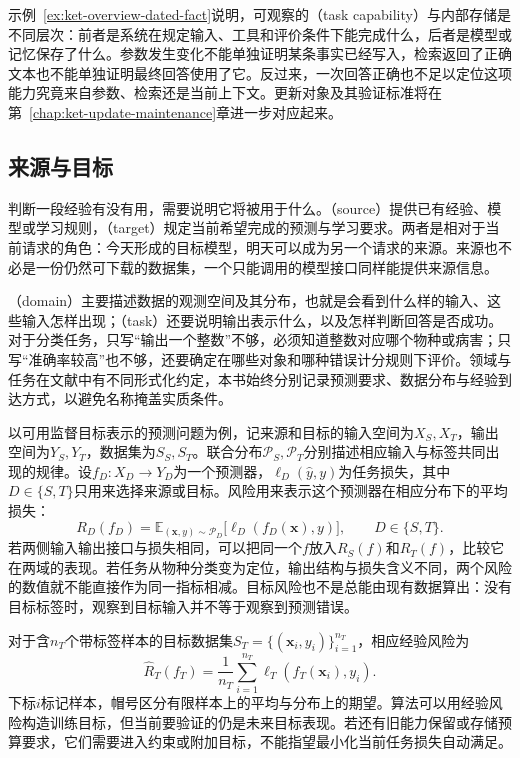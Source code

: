 示例~\ref{ex:ket-overview-dated-fact}说明，可观察的（task capability）与内部存储是不同层次：前者是系统在规定输入、工具和评价条件下能完成什么，后者是模型或记忆保存了什么。参数发生变化不能单独证明某条事实已经写入，检索返回了正确文本也不能单独证明最终回答使用了它。反过来，一次回答正确也不足以定位这项能力究竟来自参数、检索还是当前上下文。更新对象及其验证标准将在第~\ref{chap:ket-update-maintenance}章进一步对应起来。

\subsection{来源与目标}
\label{sec:ket-overview-source-target}

判断一段经验有没有用，需要说明它将被用于什么。（source）提供已有经验、模型或学习规则，（target）规定当前希望完成的预测与学习要求。两者是相对于当前请求的角色：今天形成的目标模型，明天可以成为另一个请求的来源。来源也不必是一份仍然可下载的数据集，一个只能调用的模型接口同样能提供来源信息。

（domain）主要描述数据的观测空间及其分布，也就是会看到什么样的输入、这些输入怎样出现；（task）还要说明输出表示什么，以及怎样判断回答是否成功。对于分类任务，只写“输出一个整数”不够，必须知道整数对应哪个物种或病害；只写“准确率较高”也不够，还要确定在哪些对象和哪种错误计分规则下评价。领域与任务在文献中有不同形式化约定，本书始终分别记录预测要求、数据分布与经验到达方式，以避免名称掩盖实质条件。

以可用监督目标表示的预测问题为例，记来源和目标的输入空间为$X_S,X_T$，输出空间为$Y_S,Y_T$，数据集为$S_S,S_T$。联合分布$\mathcal P_S,\mathcal P_T$分别描述相应输入与标签共同出现的规律。设$f_D:X_D\to Y_D$为一个预测器，$\ell_D(\hat y,y)$为任务损失，其中$D\in\{S,T\}$只用来选择来源或目标。风险用来表示这个预测器在相应分布下的平均损失：
\begin{equation}
  R_D(f_D)=
  \mathbb E_{(\bm{x},y)\sim\mathcal P_D}
  \bigl[\ell_D(f_D(\bm{x}),y)\bigr],
  \qquad D\in\{S,T\}.
  \label{eq:ket-overview-risk}
\end{equation}
若两侧输入输出接口与损失相同，可以把同一个$f$放入$R_S(f)$和$R_T(f)$，比较它在两域的表现。若任务从物种分类变为定位，输出结构与损失含义不同，两个风险的数值就不能直接作为同一指标相减。目标风险也不是总能由现有数据算出：没有目标标签时，观察到目标输入并不等于观察到预测错误。

对于含$n_T$个带标签样本的目标数据集$S_T=\{(\bm{x}_i,y_i)\}_{i=1}^{n_T}$，相应经验风险为
\begin{equation}
  \hat R_T(f_T)=\frac{1}{n_T}
  \sum_{i=1}^{n_T}\ell_T(f_T(\bm{x}_i),y_i).
  \label{eq:ket-overview-empirical-risk}
\end{equation}
下标$i$标记样本，帽号区分有限样本上的平均与分布上的期望。算法可以用经验风险构造训练目标，但当前要验证的仍是未来目标表现。若还有旧能力保留或存储预算要求，它们需要进入约束或附加目标，不能指望最小化当前任务损失自动满足。

